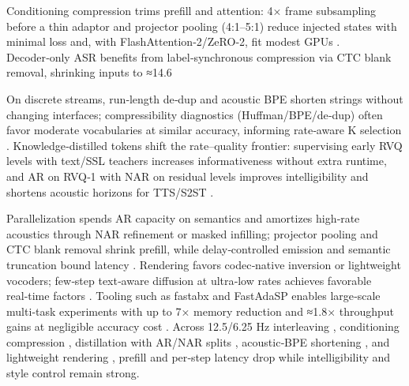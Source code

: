 Conditioning compression trims prefill and attention: 4× frame subsampling before a thin adaptor and projector pooling (4:1–5:1) reduce injected states with minimal loss and, with FlashAttention‑2/ZeRO‑2, fit modest GPUs \cite{wang2023slmbridgethingapbetweenspeechtextfoundat,nguyen2025qwenvsgemmaintegrationwhispercomparative}. Decoder‑only ASR benefits from label‑synchronous compression via CTC blank removal, shrinking inputs to ≈14.6%

On discrete streams, run‑length de‑dup and acoustic BPE shorten strings without changing interfaces; compressibility diagnostics (Huffman/BPE/de‑dup) often favor moderate vocabularies at similar accuracy, informing rate‑aware K selection \cite{vashishth2024stabspeechtokenizerassessmentbenchmark}. Knowledge‑distilled tokens shift the rate–quality frontier: supervising early RVQ levels with text/SSL teachers increases informativeness without extra runtime, and AR on RVQ‑1 with NAR on residual levels improves intelligibility and shortens acoustic horizons for TTS/S2ST \cite{ahasan2025dmcodecdistillingmultimodalrepresentatio,peng2024mslms2stmultitaskspeechlanguagemodeltext}.

Parallelization spends AR capacity on semantics and amortizes high‑rate acoustics through NAR refinement or masked infilling; projector pooling and CTC blank removal shrink prefill, while delay‑controlled emission and semantic truncation bound latency \cite{guo2025streamuniachievingstreamingspeechtransla}. Rendering favors codec‑native inversion or lightweight vocoders; few‑step text‑aware diffusion at ultra‑low rates achieves favorable real‑time factors \cite{wang2025tadicodectextawarediffusionspeechtokeniz}. Tooling such as fastabx and FastAdaSP enables large‑scale multi‑task experiments with up to 7× memory reduction and ≈1.8× throughput gains at negligible accuracy cost \cite{poli2025fastabxlibraryefficientcomputationabxdis,lu2024fastadaspmultitaskadaptedefficientinfere}. Across 12.5/6.25 Hz interleaving \cite{zeng2024scalingspeechtextpretrainingsyntheticint}, conditioning compression \cite{wang2023slmbridgethingapbetweenspeechtextfoundat,nguyen2025qwenvsgemmaintegrationwhispercomparative,tsunoo2024decoderonlyarchitecturespeechrecognition}, distillation with AR/NAR splits \cite{ahasan2025dmcodecdistillingmultimodalrepresentatio,peng2024mslms2stmultitaskspeechlanguagemodeltext}, acoustic‑BPE shortening \cite{vashishth2024stabspeechtokenizerassessmentbenchmark}, and lightweight rendering \cite{wang2025tadicodectextawarediffusionspeechtokeniz}, prefill and per‑step latency drop while intelligibility and style control remain strong.

